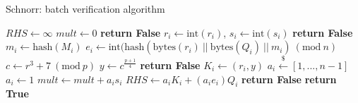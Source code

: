 \begin{algorithm}
	\caption{Schnorr: batch verification algorithm}
	\label{alg:schnorr_batch}
	\begin{algorithmic}[1]
		\State $RHS \gets \infty$
		\State $mult \gets 0$
		\State \textbf{return False}
		\EndIf
		\State $r_i \gets \text{int}(r_i)$, $s_i \gets \text{int}(s_i)$
		\State \textbf{return False}
		\EndIf
		\State $m_i \gets \text{hash}(M_i)$
		\State $e_i \gets \text{int}(\text{hash}(\text{bytes}(r_i) \ || \ \text{bytes}(Q_i) \ || \ m_i) \ (\text{mod} \ n)$
		\State $c \gets r^3 + 7 \ (\text{mod} \ p)$
		\State $y \gets c^{\frac{p + 1}{4}}$
		\State \textbf{return False}
		\EndIf
		\State $K_i \gets (r_i, y)$
		\State  $a_i \xleftarrow{\text{\$}} [1, ..., n - 1]$ 
		\Else
		\State $a_i \gets 1$
		\EndIf
		\State $mult \gets mult + a_is_i$
		\State $RHS \gets a_iK_i + (a_ie_i)Q_i$
		\EndFor
		\State \textbf{return False}
		\EndIf
		\State \textbf{return True}
		\EndProcedure	
	\end{algorithmic}
\end{algorithm}